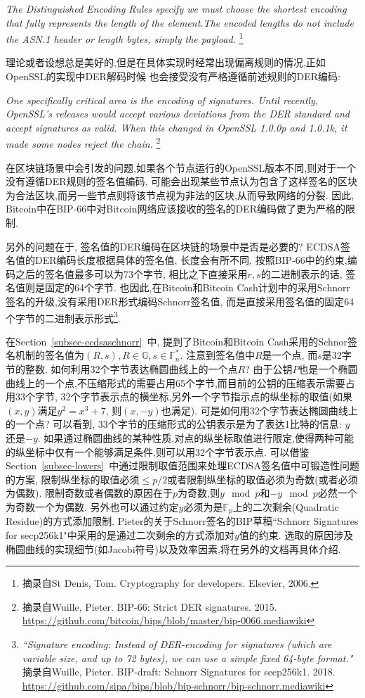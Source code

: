 \documentclass{article}
\renewcommand{\G}{\mathbb{G}}
\newcommand{\F}{\mathbb{F}}
\begin{document}
\textit{
The Distinguished Encoding Rules specify we must choose the shortest encoding that fully represents the length of the element.The encoded lengths do not include the ASN.1 header or length bytes, simply the payload.
}\footnote{
摘录自St Denis, Tom. Cryptography for developers. Elsevier, 2006.}

理论或者设想总是美好的,但是在具体实现时经常出现偏离规则的情况,正如OpenSSL的实现中DER解码时候
也会接受没有严格遵循前述规则的DER编码:

\textit{
One specifically critical area is the encoding of signatures. Until recently, OpenSSL's releases would accept various deviations from the DER standard and accept signatures as valid. When this changed in OpenSSL 1.0.0p and 1.0.1k, it made some nodes reject the chain.
}\footnote{
摘录自Wuille, Pieter. BIP-66: Strict DER signatures. 2015. \url{https://github.com/bitcoin/bips/blob/master/bip-0066.mediawiki}
}

在区块链场景中会引发的问题,如果各个节点运行的OpenSSL版本不同,则对于一个没有遵循DER规则的签名值编码,
可能会出现某些节点认为包含了这样签名的区块为合法区块,而另一些节点则将该节点视为非法的区块,从而导致网络的分裂.
因此, Bitcoin中在BIP-66中对Bitcoin网络应该接收的签名的DER编码做了更为严格的限制.

另外的问题在于, 签名值的DER编码在区块链的场景中是否是必要的? ECDSA签名值的DER编码长度根据具体的签名值,
长度会有所不同, 按照BIP-66中的约束,编码之后的签名值最多可以为73个字节, 相比之下直接采用$r, s$的二进制表示的话,
签名值则是固定的64个字节. 也因此,在Bitcoin和Bitcoin Cash计划中的采用Schnorr签名的升级,没有采用DER形式编码Schnorr签名值,
而是直接采用签名值的固定64个字节的二进制表示形式\footnote{
\textit{``Signature encoding: Instead of DER-encoding for signatures (which are variable size, and up to 72 bytes), we can use a simple fixed 64-byte format."} 
摘录自Wuille, Pieter. BIP-draft: Schnorr Signatures for secp256k1. 2018. 
\url{https://github.com/sipa/bips/blob/bip-schnorr/bip-schnorr.mediawiki}
}.

在Section~\ref{subsec-ecdsaschnorr}~中, 提到了Bitcoin和Bitcoin Cash采用的Schnor签名机制的签名值为$(R,s), R\in \G, s\in \F_n^*$.
注意到签名值中$R$是一个点, 而$s$是32字节的整数. 如何利用32个字节表达椭圆曲线上的一个点$R$? 
由于公钥$P$也是一个椭圆曲线上的一个点,不压缩形式的需要占用65个字节,而目前的公钥的压缩表示需要占用$33$个字节,
32个字节表示点的横坐标,另外一个字节指示点的纵坐标的取值(如果$(x, y)$满足$y^2=x^3 + 7$, 则$(x, -y)$也满足).
可是如何用32个字节表达椭圆曲线上的一个点? 可以看到, 33个字节的压缩形式的公钥表示是为了表达1比特的信息: $y$还是$-y$.
如果通过椭圆曲线的某种性质,对点的纵坐标取值进行限定,使得两种可能的纵坐标中仅有一个能够满足条件,则可以用32个字节表示点.
可以借鉴Section~\ref{subsec-lowers}~中通过限制取值范围来处理ECDSA签名值中可锻造性问题的方案, 
限制纵坐标的取值必须$\leq p/2$或者限制纵坐标的取值必须为奇数(或者必须为偶数). 
限制奇数或者偶数的原因在于$p$为奇数,则$y \mod p$和$-y \mod p$必然一个为奇数一个为偶数.
另外也可以通过约定$y$必须为是$\F_p$上的二次剩余(Quadratic Residue)的方式添加限制.
Pieter的关于Schnorr签名的BIP草稿``Schnorr Signatures for secp256k1"中采用的是通过二次剩余的方式添加对$y$值的约束.
选取的原因涉及椭圆曲线的实现细节(如Jacobi符号)以及效率因素,将在另外的文档再具体介绍.
\end{document}
